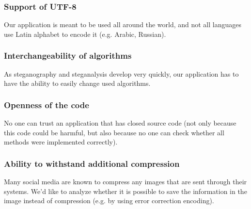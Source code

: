 \subsubsection{Support of UTF-8}
Our application is meant to be used all around the world, and not all languages use
Latin alphabet to encode it (e.g. Arabic, Russian). 

\subsubsection{Interchangeability of algorithms}
As steganography and steganalysis develop very quickly, our application
has to have the ability to easily change used algorithms.  

\subsubsection{Openness of the code}
No one can trust an application that has closed source code (not only because
this code could be harmful, but also because no one can check whether all
methods were implemented correctly).

\subsubsection{Ability to withstand additional compression}
Many social media are known to compress any images that are sent through
their systems. We'd like to analyze whether it is possible to save the information
in the image instead of compression (e.g. by using error correction encoding).
